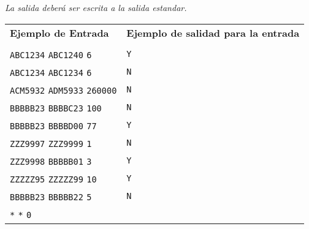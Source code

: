 \documentclass[a4paper,12pt]{article}
\begin{document}
\emph{La salida deberá ser escrita a la salida estandar.}\\

\begin{tabular}{|l|l|}
  \hline
  \textbf{Ejemplo de Entrada}&\textbf{Ejemplo de salidad para la entrada}\\
   &\\
  \verb|ABC1234| \verb|ABC1240| \verb|6| & \verb|Y| \\     
  \verb|ABC1234| \verb|ABC1234| \verb|6| & \verb|N| \\     
  \verb|ACM5932| \verb|ADM5933| \verb|260000| & \verb|N| \\     
  \verb|BBBBB23| \verb|BBBBC23| \verb|100| & \verb|N| \\     
  \verb|BBBBB23| \verb|BBBBD00| \verb|77| & \verb|Y| \\     
  \verb|ZZZ9997| \verb|ZZZ9999| \verb|1| & \verb|N| \\     
  \verb|ZZZ9998| \verb|BBBBB01| \verb|3| & \verb|Y| \\     
  \verb|ZZZZZ95| \verb|ZZZZZ99| \verb|10| & \verb|Y| \\     
  \verb|BBBBB23| \verb|BBBBB22| \verb|5| & \verb|N| \\     
  \verb|*| \verb|*| \verb|0| &  \\     
  \hline
\end{tabular}
\end{document}
